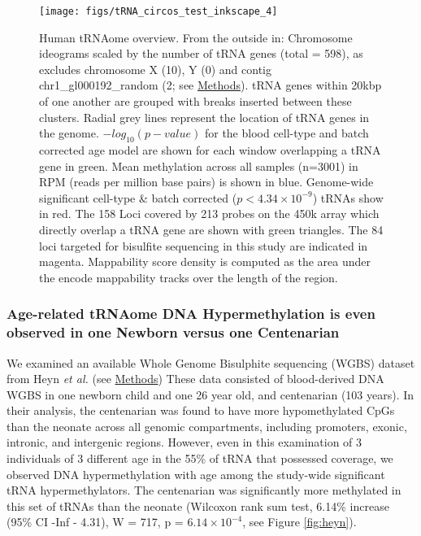 \documentclass[]{book}
\begin{document}
\begin{figure}

{\centering \texttt{[image: figs/tRNA\_circos\_test\_inkscape\_4]} 

}

\caption{Human tRNAome overview. From the outside in: Chromosome ideograms scaled by the number of tRNA genes (total = 598), as excludes chromosome X (10), Y (0) and contig chr1\_gl000192\_random (2; see \protect\hyperlink{tRNAanno}{Methods}). tRNA genes within 20kbp of one another are grouped with breaks inserted between these clusters. Radial grey lines represent the location of tRNA genes in the genome. \(-log_{10}(p-value)\) for the blood cell-type and batch corrected age model are shown for each window overlapping a tRNA gene in green. Mean methylation across all samples (n=3001) in RPM (reads per million base pairs) is shown in blue. Genome-wide significant cell-type \& batch corrected (\(p < 4.34\times10^{-9}\)) tRNAs show in red. The 158 Loci covered by 213 probes on the 450k array which directly overlap a tRNA gene are shown with green triangles. The 84 loci targeted for bisulfite sequencing in this study are indicated in magenta. Mappability score density is computed as the area under the encode mappability tracks \citep{Derrien2012} over the length of the region.}\label{fig:circos}
\end{figure}



\newpage

\hypertarget{age-related-trnaome-dna-hypermethylation-is-even-observed-in-one-newborn-versus-one-centenarian}{%
\subsubsection{Age-related tRNAome DNA Hypermethylation is even observed in one Newborn versus one Centenarian}\label{age-related-trnaome-dna-hypermethylation-is-even-observed-in-one-newborn-versus-one-centenarian}}

We examined an available Whole Genome Bisulphite sequencing (WGBS) dataset from Heyn \emph{et al.} \citep{Heyn2012} (see \protect\hyperlink{Methods}{Methods})
These data consisted of blood-derived DNA WGBS in one newborn child and one 26 year old, and centenarian (103 years).
In their analysis, the centenarian was found to have more hypomethylated CpGs than the neonate across all genomic compartments, including promoters, exonic, intronic, and intergenic regions.
However, even in this examination of 3 individuals of 3 different age in the 55\% of tRNA that possessed coverage, we observed DNA hypermethylation with age among the study-wide significant tRNA hypermethylators. The centenarian was significantly more methylated in this set of tRNAs than the neonate (Wilcoxon rank sum test, 6.14\% increase (95\% CI -Inf - 4.31), W = 717, p = \(6.14\times10^{-4}\), see Figure \ref{fig:heyn}).
\end{document}
